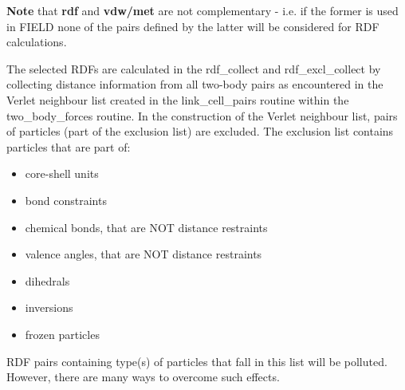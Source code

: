 \begin{enumerate}
{\bf Note} that {\bf rdf} and {\bf vdw/met} are not complementary -
i.e. if the former is used in FIELD none of the pairs defined by the
latter will be considered for RDF calculations.

The selected RDFs are calculated in the {\sc rdf\_collect} and {\sc rdf\_excl\_collect}
by collecting distance information from all two-body pairs as encountered
in the Verlet neighbour list created in the {\sc link\_cell\_pairs}
routine within the {\sc two\_body\_forces} routine.  In the
construction of the Verlet neighbour list, pairs of particles
(part of the exclusion list) are excluded.  The exclusion list contains
particles that are part of:
\begin{itemize}
\item core-shell units
\item bond constraints
\item chemical bonds, that are NOT distance restraints
\item valence angles, that are NOT distance restraints
\item dihedrals
\item inversions
\item frozen particles
\end{itemize}
RDF pairs containing type(s) of particles that fall in this list will
be polluted.  However, there are many ways to overcome such effects.


\end{enumerate}
